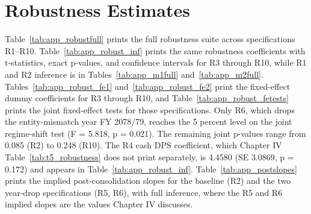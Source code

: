 \section{Robustness Estimates}

Table~\ref{tab:app_robustfull} prints the full robustness suite across specifications R1--R10. Table~\ref{tab:app_robust_inf} prints the same robustness coefficients with t-statistics, exact p-values, and confidence intervals for R3 through R10, while R1 and R2 inference is in Tables~\ref{tab:app_m1full} and~\ref{tab:app_m2full}. Tables~\ref{tab:app_robust_fe1} and~\ref{tab:app_robust_fe2} print the fixed-effect dummy coefficients for R3 through R10, and Table~\ref{tab:app_robust_fetests} prints the joint fixed-effect tests for those specifications. Only R6, which drops the entity-mismatch year FY 2078/79, reaches the 5 percent level on the joint regime-shift test (F = 5.818, p = 0.021). The remaining joint p-values range from 0.085 (R2) to 0.248 (R10). The R4 cash DPS coefficient, which Chapter IV Table~\ref{tab:t5_robustness} does not print separately, is 4.4580 (SE 3.0869, p = 0.172) and appears in Table~\ref{tab:app_robust_inf}. Table~\ref{tab:app_postslopes} prints the implied post-consolidation slopes for the baseline (R2) and the two year-drop specifications (R5, R6), with full inference, where the R5 and R6 implied slopes are the values Chapter IV discusses.

